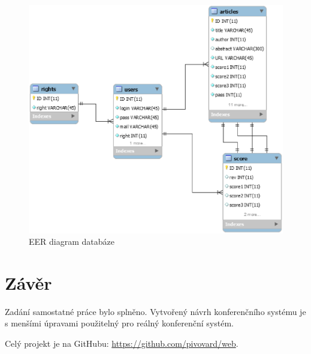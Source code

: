 \begin{figure}[H]
	\centering
	\includegraphics[width=1\textwidth]{img/web_sp_EER.eps}
	\caption{EER diagram databáze}
  \label{eer}
\end{figure}





\chapter{Závěr}

Zadání samostatné práce bylo splněno. Vytvořený návrh konferenčního systému je s menšími úpravami použitelný pro reálný konferenční systém.

Celý projekt je na GitHubu: \url{https://github.com/pivovard/web}.

